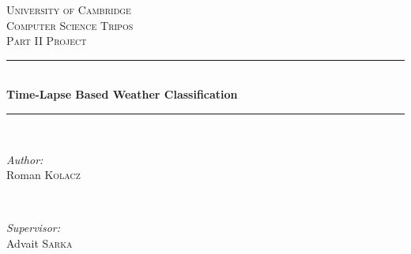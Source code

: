 \documentclass[14]{report}
\begin{document}
\begin{titlepage}

\newcommand{\HRule}{\rule{\linewidth}{0.5mm}} %

\center %
 

\textsc{\LARGE University of Cambridge}\\[1.5cm] %
\textsc{\Large Computer Science Tripos}\\[0.5cm] %
\textsc{\large Part II Project}\\[0.5cm] %


\HRule \\[0.4cm]
{ \huge \bfseries Time-Lapse Based Weather Classification}\\[0.4cm] %
\HRule \\[1.5cm]
 

\begin{minipage}{0.4\textwidth}
\begin{flushleft} \large
\emph{Author:}\\
Roman \textsc{Kolacz} %
\end{flushleft}
\end{minipage}
~
\begin{minipage}{0.4\textwidth}
\begin{flushright} \large
\emph{Supervisor:} \\
Advait \textsc{Sarka} %
\end{flushright}
\end{minipage}\\[4cm]



\end{titlepage}
\end{document}
